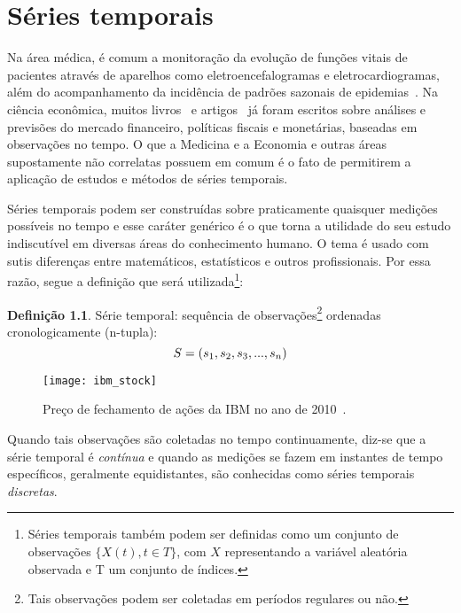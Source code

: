 \chapter{Séries temporais}
\label{chap:time-series}
Na área médica, é comum a monitoração da evolução de funções vitais de pacientes através de aparelhos como eletroencefalogramas e eletrocardiogramas, além do acompanhamento da incidência de padrões sazonais de epidemias~\cite{metodosmedicina}. Na ciência econômica, muitos livros~\cite{forecastingeconomic} e artigos~\cite{germantimeseries} já foram escritos sobre análises e previsões do mercado financeiro, políticas fiscais e monetárias, baseadas em observações no tempo. O que a Medicina e a Economia e outras áreas supostamente não correlatas possuem em comum é o fato de permitirem a aplicação de estudos e métodos de séries temporais.

Séries temporais podem ser construídas sobre praticamente quaisquer medições possíveis no tempo e esse caráter genérico é o que torna a utilidade do seu estudo indiscutível em diversas áreas do conhecimento humano. O tema é usado com sutis diferenças entre matemáticos, estatísticos e outros profissionais. Por essa razão, segue a definição que será utilizada\footnote{Séries temporais também podem ser definidas como um conjunto de observações $\{X(t), t \in T\}$, com $X$ representando a variável aleatória observada e T um conjunto de índices.}:


\theoremstyle{definition}
\newtheorem{time-series}{Definição}
\begin{time-series}
Série temporal: sequência de observações\footnote{Tais observações podem ser coletadas em períodos regulares ou não.} ordenadas cronologicamente (n-tupla):
\begin{equation}\label{eq:time-series}
 \\S = (s_{1}, s_{2}, s_{3}, ..., s_{n})
\end{equation}
\end{time-series}

  \begin{figure}
    \begin{center}
      \texttt{[image: ibm\_stock]}
      \centering
      \caption[Preço de fechamento de ações da IBM - 2010.]{Preço de fechamento de ações da IBM no ano de 2010~\cite{wolframalpha}.}
    \label{fig:ibm-stock}
    \end{center}
  \end{figure}

Quando tais observações são coletadas no tempo continuamente, diz-se que a série temporal é \textit{contínua} e quando as medições se fazem em instantes de tempo específicos, geralmente equidistantes, são conhecidas como séries temporais \textit{discretas}. 

